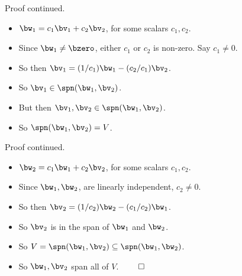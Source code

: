 \documentclass{beamer}
\begin{document}
\begin{frame}{Proof continued.}

\begin{itemize}
\item $\bw_1 = c_1\bv_1 + c_2\bv_2$, for some scalars $c_1, c_2$.
\item Since $\bw_1\not=\bzero$, either $c_1$ or $c_2$ is non-zero. Say $c_1 \not= 0$.
\item So then $\bv_1 = (1/c_1)\bw_1 - (c_2/c_1)\bv_2$.
\item So $\bv_1\in\spn(\bw_1,\bv_2)$.
\item But then $\bv_1,\bv_2\in\spn(\bw_1,\bv_2)$.
\item So $\spn(\bw_1,\bv_2)=V$.
\end{itemize}

\end{frame}

\begin{frame}{Proof continued.}

\begin{itemize}
\item $\bw_2 = c_1\bw_1 + c_2\bv_2$, for some scalars $c_1, c_2$.
\item Since $\bw_1, \bw_2$, are linearly independent, $c_2 \not= 0$.
\item So then $\bv_2 = (1/c_2)\bw_2 - (c_1/c_2)\bw_1$.
\item So $\bv_2$ is in the span of $\bw_1$ and $\bw_2$.
\item So $V=\spn(\bw_1,\bv_2)\subseteq\spn(\bw_1,\bw_2)$.
\item So $\bw_1,\bv_2$ span all of $V$. $\qed$
\end{itemize}

\end{frame}
\end{document}

